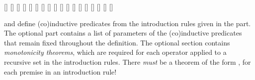 \begin{isabellebody}
\begin{isamarkuptext}
  \begin{railoutput}
\rail@bar
{}[]
[]
[]
[]
\rail@endbar
\rail@bar
{}
[]
\rail@endbar
{}[]
\rail@bar
{}
[]
[]
\rail@endbar
{}
\rail@bar
{}
[]
[]
\rail@endbar
\rail@bar
{}
[]
[]
\rail@endbar
\rail@end
{}
\rail@plus
\rail@bar
{}
[]
\rail@endbar
{}[]
[]
\rail@endplus
\rail@end
{}
[]
\rail@bar
{}
[]
[]
\rail@endbar
\rail@end
\end{railoutput}


  \begin{description}

  \item \hyperlink{command.HOL.inductive}{\mbox{}} and \hyperlink{command.HOL.coinductive}{\mbox{}} define (co)inductive predicates from the
  introduction rules given in the \hyperlink{keyword.where}{\mbox{}} part.  The
  optional \hyperlink{keyword.for}{\mbox{}} part contains a list of parameters of the
  (co)inductive predicates that remain fixed throughout the
  definition.  The optional \hyperlink{keyword.monos}{\mbox{}} section contains
  \emph{monotonicity theorems}, which are required for each operator
  applied to a recursive set in the introduction rules.  There
  \emph{must} be a theorem of the form ,
  for each premise  in an introduction rule!


\end{description}
\end{isamarkuptext}
\end{isabellebody}
